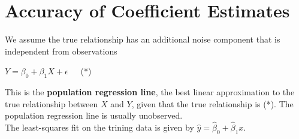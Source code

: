 	\section{Accuracy of Coefficient Estimates}
		We assume the true relationship has an additional noise component that is independent from observations
		\begin{center}
			$Y = \beta_0 + \beta_1X + \epsilon$\ \ \ (*)
		\end{center}
		This is the \textbf{population regression line}, the best linear approximation to the true relationship between $X$ and $Y$, given that the true relationship is (*).
		The population regression line is usually unobserved.\\
		The least-squares fit on the trining data is given by $\hat{y} = \hat{\beta}_0 + \hat{\beta}_1x$.

































